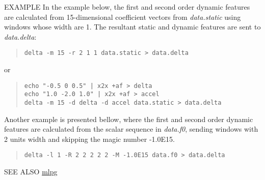 \begin{options}

\end{options}

\begin{qsection}{EXAMPLE}
In the example below, the first and second order dynamic features are calculated from 15-dimensional
coefficient vectors from {\em data.static} using windows whose width
are 1. The resultant
static and dynamic features are sent to {\em data.delta}:
 \begin{quote}
	\verb!delta -m 15 -r 2 1 1 data.static > data.delta!
 \end{quote}
	or
 \begin{quote}
	\verb!echo "-0.5 0 0.5" | x2x +af > delta! \\
	\verb!echo "1.0 -2.0 1.0" | x2x +af > accel! \\
	\verb!delta -m 15 -d delta -d accel data.static > data.delta!
 \end{quote}
Another example is presented bellow, where the first and second order
dynamic features are calculated from the scalar sequence in {\em
  data.f0}, sending windows with 2 units width and skipping the magic
number -1.0E15.
 \begin{quote}
	\verb!delta -l 1 -R 2 2 2 2 2 -M -1.0E15 data.f0 > data.delta!
 \end{quote}
\end{qsection}

\begin{qsection}{SEE ALSO}
\hyperlink{mlpg}{mlpg}
\end{qsection}
